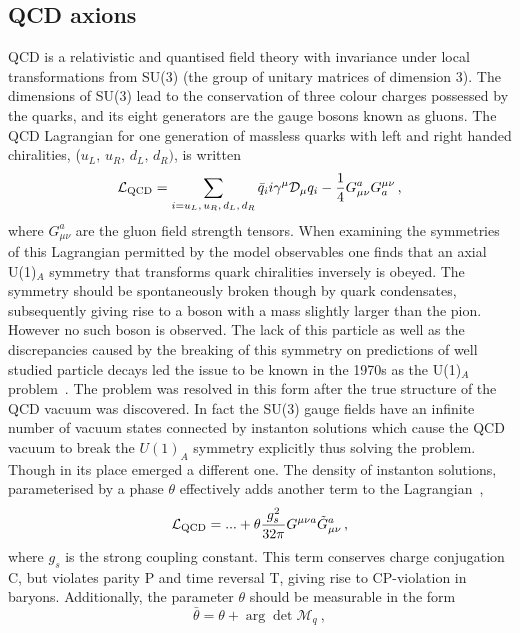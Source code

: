 \subsection{QCD axions}\label{sec:axions_qcdaxion}
QCD is a relativistic and quantised field theory with invariance under local transformations from SU(3) (the group of unitary matrices of dimension 3). The dimensions of SU(3) lead to the conservation of three colour charges possessed by the quarks, and its eight generators are the gauge bosons known as gluons. The QCD Lagrangian for one generation of massless quarks with left and right handed chiralities, ($u_L,\, u_R,\, d_L,\, d_R)$, is written
\begin{equation}
\mathcal{L}_{\rm QCD} = \sum_{i = u_L,\,u_R,\,d_L,\,d_R} \bar{q}_i i \gamma^{\mu}\mathcal{D}_\mu q_i - \frac{1}{4}G_{\mu \nu}^a G^{\mu \nu}_a \, ,
\end{equation}
where $G^a_{\mu\nu}$ are the gluon field strength tensors. When examining the symmetries of this Lagrangian permitted by the model observables one finds that an axial U(1)$_A$ symmetry that transforms quark chiralities inversely is obeyed. The symmetry should be spontaneously broken though by quark condensates, subsequently giving rise to a boson with a mass slightly larger than the pion. However no such boson is observed. The lack of this particle as well as the discrepancies caused by the breaking of this symmetry on predictions of well studied particle decays led the issue to be known in the 1970s as the U(1)$_A$ problem~\cite{Weinberg:1975ui}. The problem was resolved in this form after the true structure of the QCD vacuum was discovered. In fact the SU(3) gauge fields have an infinite number of vacuum states connected by instanton solutions which cause the QCD vacuum to break the $U(1)_A$ symmetry explicitly thus solving the problem. Though in its place emerged a different one. The density of instanton solutions, parameterised by a phase $\theta$ effectively adds another term to the Lagrangian~\cite{tHooft:1976rip},
\begin{equation}\label{eq:instanton}
\mathcal{L}_{\rm QCD} = ... + \theta \frac{g_s^2}{32 \pi} G^{\mu \nu a} \tilde{G}_{\mu \nu}^a \, ,
\end{equation}
where $g_s$ is the strong coupling constant. This term conserves charge conjugation C, but violates parity P and time reversal T, giving rise to CP-violation in baryons. Additionally, the parameter $\theta$ should be measurable in the form
\begin{equation}
\bar{\theta} = \theta + \arg \det \mathcal{M}_q \ ,
\end{equation}
